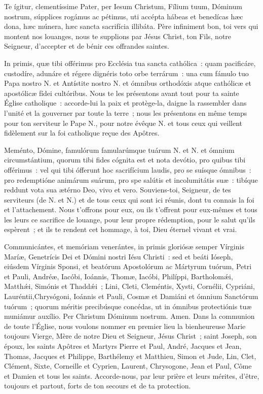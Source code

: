 \begin{paracol}{2}

\LigneParacol
{Te ígitur, clementíssime Pater, per Iesum Christum, Fílium tuum, Dóminum nostrum, súpplices rogámus ac pétimus, uti accépta hábeas et benedícas hæc dona, hæc múnera, hæc sancta sacrifícia illibáta.}
{Père infiniment bon, toi vers qui mon\-tent nos louanges, nous te supplions par Jésus Christ, ton Fils, notre Seigneur, d'accepter et de bénir ces offrandes saintes.}

\LigneParacol
{In primis, quæ tibi offérimus pro Ecclésia tua sancta cathólica~: quam pacificáre, custodíre, adunáre et régere dignéris toto orbe terrárum~: una cum fámulo tuo Papa nostro {\color{rougeliturgique}N.} et Antístite nostro {\color{rougeliturgique}N.} et ómnibus orthodóxis atque cathólicæ et apostólicæ fídei cultóribus.}
{Nous te les présentons avant tout pour ta sainte Église catholique~: accorde-lui la paix et protège-la, daigne la rassembler dans l'unité et la gouverner par toute la terre~; nous les présentons en même temps pour ton serviteur le Pape {\color{rougeliturgique}N.}, pour notre évêque {\color{rougeliturgique}N.} et tous ceux qui veillent fidèlement sur la foi catholique reçue des Apôtres.}

\LigneParacol
{Meménto, Dómine, famulórum famularúmque tuárum {\color{rougeliturgique}N.} et {\color{rougeliturgique}N.} et ómnium circumstántium, quorum tibi fides cógnita est et nota devótio, pro quibus tibi offérimus~: vel qui tibi ófferunt hoc sacrifícium laudis, pro se suísque ómnibus~: pro redemptióne animárum suárum, pro spe salútis et incolumitátis suæ~: tibíque reddunt vota sua ætérno Deo, vivo et vero.}
{Souviens-toi, Seigneur, de tes serviteurs (de {\color{rougeliturgique}N.} et {\color{rougeliturgique}N.}) et de tous ceux qui sont ici réunis, dont tu connais la foi et l'attachement. Nous t'offrons pour eux, ou ils t'offrent pour eux-mêmes et tous les leurs ce sacrifice de louange, pour leur propre rédemption, pour le salut qu'ils espèrent~; et ils te rendent cet hommage, à toi, Dieu éternel vivant et vrai.}

\LigneParacol
{Communicántes, et memóriam venerántes, in primis gloriósæ semper Vírginis Maríæ, Genetrícis Dei et Dómini nostri Iésu Christi~: sed et beáti Ióseph, eiúsdem Vírginis Sponsi, et beatórum Apostolórum ac Mártyrum tuórum, Petri et Pauli, Andréæ, Iacóbi, Ioánnis, Thomæ, Iacóbi, Philíppi, Bartholomǽi, Matthǽi, Simónis et Thaddǽi~; Lini, Cleti, Cleméntis, Xysti, Cornélii, Cypriáni, Lauréntii,Chrysógoni, Ioánnis et Pauli, Cosmæ et Damiáni et ómnium Sanctórum tuórum~; quorum méritis precibúsque concédas, ut in ómnibus protectiónis tuæ muniámur auxílio. Per Christum Dóminum nostrum. Amen.}
{Dans la communion de toute l'Église, nous voulons nommer en premier lieu la bienheureuse Marie toujours Vierge, Mère de notre Dieu et Seigneur, Jésus Christ~; saint Joseph, son époux, les saints Apôtres et Martyrs Pierre et Paul, André, Jacques et Jean, Thomas, Jacques et Philippe, Barthélemy et Matthieu, Simon et Jude, Lin, Clet, Clément, Sixte, Corneille et Cyprien, Laurent, Chrysogone, Jean et Paul, Côme et Damien et tous les saints. Accorde-nous, par leur prière et leurs mérites, d'être, toujours et partout, forts de ton secours et de ta protection.}


\end{paracol}
